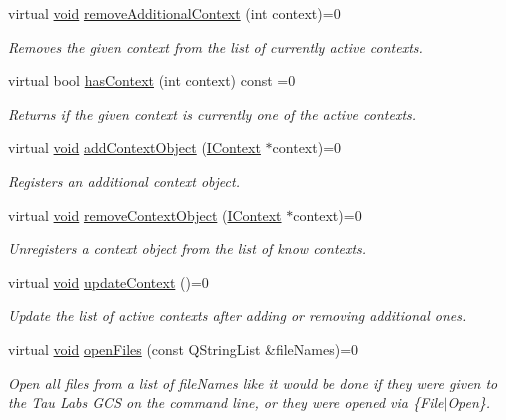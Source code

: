 \begin{DoxyCompactItemize}
virtual \hyperlink{group___u_a_v_objects_plugin_ga444cf2ff3f0ecbe028adce838d373f5c}{void} \hyperlink{group___core_plugin_gaa15d98e15b7b7af2e1788e3101a4c963}{remove\-Additional\-Context} (int context)=0
\begin{DoxyCompactList}\small\item\em \-Removes the given {\itshape context\/} from the list of currently active contexts. \end{DoxyCompactList}\item 
virtual bool \hyperlink{group___core_plugin_ga1539030d8233cf72cf0159dec2aeab83}{has\-Context} (int context) const =0
\begin{DoxyCompactList}\small\item\em \-Returns if the given {\itshape context\/} is currently one of the active contexts. \end{DoxyCompactList}\item 
virtual \hyperlink{group___u_a_v_objects_plugin_ga444cf2ff3f0ecbe028adce838d373f5c}{void} \hyperlink{group___core_plugin_gafaeb9ae3d74d909c935810ae606b6ad9}{add\-Context\-Object} (\hyperlink{class_core_1_1_i_context}{\-I\-Context} $\ast$context)=0
\begin{DoxyCompactList}\small\item\em \-Registers an additional {\itshape context\/} object. \end{DoxyCompactList}\item 
virtual \hyperlink{group___u_a_v_objects_plugin_ga444cf2ff3f0ecbe028adce838d373f5c}{void} \hyperlink{group___core_plugin_ga4096e8d8e023fbd4b51574f274367b47}{remove\-Context\-Object} (\hyperlink{class_core_1_1_i_context}{\-I\-Context} $\ast$context)=0
\begin{DoxyCompactList}\small\item\em \-Unregisters a {\itshape context\/} object from the list of know contexts. \end{DoxyCompactList}\item 
virtual \hyperlink{group___u_a_v_objects_plugin_ga444cf2ff3f0ecbe028adce838d373f5c}{void} \hyperlink{group___core_plugin_ga6c04b622e19d7eb2e2227f450414cbd1}{update\-Context} ()=0
\begin{DoxyCompactList}\small\item\em \-Update the list of active contexts after adding or removing additional ones. \end{DoxyCompactList}\item 
virtual \hyperlink{group___u_a_v_objects_plugin_ga444cf2ff3f0ecbe028adce838d373f5c}{void} \hyperlink{group___core_plugin_gaa2b7ab1cb01663d235c45706ffd38d1d}{open\-Files} (const \-Q\-String\-List \&file\-Names)=0
\begin{DoxyCompactList}\small\item\em \-Open all files from a list of {\itshape file\-Names\/} like it would be done if they were given to the \-Tau \-Labs \-G\-C\-S on the command line, or they were opened via \{\-File$|$\-Open\}. \end{DoxyCompactList}\end{DoxyCompactItemize}
